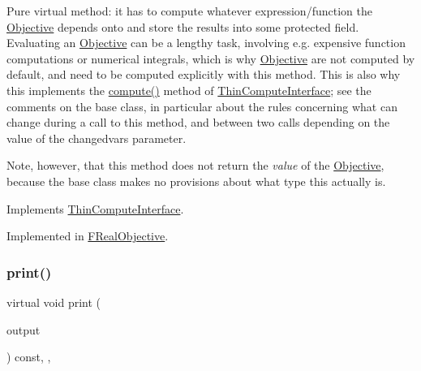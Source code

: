 Pure virtual method\+: it has to compute whatever expression/function the \mbox{\hyperlink{class_s_m_spp__di__unipi__it_1_1_objective}{Objective}} depends onto and store the results into some protected field. Evaluating an \mbox{\hyperlink{class_s_m_spp__di__unipi__it_1_1_objective}{Objective}} can be a lengthy task, involving e.\+g. expensive function computations or numerical integrals, which is why \mbox{\hyperlink{class_s_m_spp__di__unipi__it_1_1_objective}{Objective}} are not computed by default, and need to be computed explicitly with this method. This is also why this implements the \mbox{\hyperlink{class_s_m_spp__di__unipi__it_1_1_objective_a504d4e3e174c7a518cc66156a8a45ce5}{compute()}} method of \mbox{\hyperlink{class_s_m_spp__di__unipi__it_1_1_thin_compute_interface}{Thin\+Compute\+Interface}}; see the comments on the base class, in particular about the rules concerning what can change during a call to this method, and between two calls depending on the value of the changedvars parameter.

Note, however, that this method does not return the {\itshape value} of the \mbox{\hyperlink{class_s_m_spp__di__unipi__it_1_1_objective}{Objective}}, because the base class makes no provisions about what type this actually is. 

Implements \mbox{\hyperlink{class_s_m_spp__di__unipi__it_1_1_thin_compute_interface_a00fd6363d98ea46bcc273842b327d050}{Thin\+Compute\+Interface}}.



Implemented in \mbox{\hyperlink{class_s_m_spp__di__unipi__it_1_1_f_real_objective_afc8ff54ab05d22f4cca0fb0bfbeb7a49}{F\+Real\+Objective}}.

\mbox{\label{class_s_m_spp__di__unipi__it_1_1_objective_a2e7b9c9148a98c5c342e8c25cac95926}} 
\subsubsection{\texorpdfstring{print()}{print()}}
{\footnotesize\ttfamily virtual void print (\begin{DoxyParamCaption}\item[{std\+::ostream \&}]{output }\end{DoxyParamCaption}) const\hspace{0.3cm}{\ttfamily [inline]}, {\ttfamily [protected]}, {\ttfamily [virtual]}}



